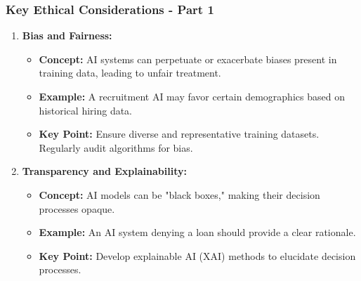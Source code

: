 \documentclass[aspectratio=169]{beamer}
\begin{document}
\begin{frame}[fragile]
    \frametitle{Key Ethical Considerations - Part 1}
    \begin{enumerate}
        \item \textbf{Bias and Fairness:}
        \begin{itemize}
            \item \textbf{Concept:} AI systems can perpetuate or exacerbate biases present in training data, leading to unfair treatment.
            \item \textbf{Example:} A recruitment AI may favor certain demographics based on historical hiring data.
            \item \textbf{Key Point:} Ensure diverse and representative training datasets. Regularly audit algorithms for bias.
        \end{itemize}
        
        \item \textbf{Transparency and Explainability:}
        \begin{itemize}
            \item \textbf{Concept:} AI models can be "black boxes," making their decision processes opaque.
            \item \textbf{Example:} An AI system denying a loan should provide a clear rationale.
            \item \textbf{Key Point:} Develop explainable AI (XAI) methods to elucidate decision processes.
        \end{itemize}
    \end{enumerate}
\end{frame}
\end{document}
